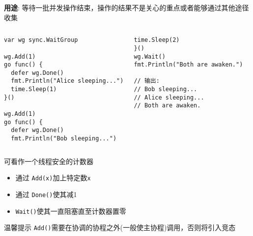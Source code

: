 \begin{frame}[fragile]{\WaitGroup}
   \textbf{用途}: 等待一批并发操作结束，\alert{操作的结果不是关心的重点或者能够通过其他途径收集} 

   \begin{columns}[t]
\begin{lstlisting}[xleftmargin=8pt]
var wg sync.WaitGroup

wg.Add(1)
go func() {
  defer wg.Done()
  fmt.Println("Alice sleeping...")
  time.Sleep(1)
}()

wg.Add(1)
go func() {
  defer wg.Done()
  fmt.Println("Bob sleeping...")
\end{lstlisting}

\begin{lstlisting}[firstnumber=last,xleftmargin=16pt]
  time.Sleep(2)
}()
wg.Wait()
fmt.Println("Both are awaken.")

// 输出:
// Bob sleeping...
// Alice sleeping...
// Both are awaken.
\end{lstlisting}
   \end{columns}
\end{frame}

\begin{frame}{\WaitGroup}
    \WaitGroup 可看作一个线程安全的计数器

    \begin{itemize}
        \item 通过 \texttt{Add(x)}加上特定数\texttt{x}
        \item 通过 \texttt{Done()}使其减1
        \item \texttt{Wait()}使其一直阻塞直至计数器置零
    \end{itemize}

    \begin{alertblock}{温馨提示}
        \texttt{Add()}需要在\WaitGroup 协调的协程之外(一般使主协程)调用，否则将引入\alert{竞态}
    \end{alertblock}
\end{frame}